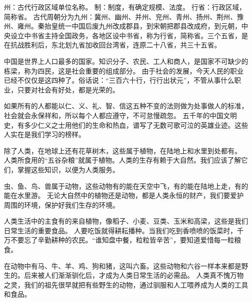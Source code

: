 \documentclass[avery5371,grid]{flashcards}
\begin{document}
{州：古代行政区域单位名称。 制：制度，有确定规模、法度。 行省：行政区域，简称省。} %
{古代周朝分为九州：冀州、幽州、并州、兖州、青州、扬州、荆州、豫州、雍州。秦抬皇统一中国后废九州改成郡县，到宋朝把郡县改成府，到元朝，中央设立中书省主持全国政务，各地区设中书省，称为行省，简称省。三个五省，是在抗战胜利后，东北划九省加收回台湾省，连原二十八省，共三十五省。} %

{中国是世界上人口最多的国家。知识分子、农民、工人和商人，是国家不可缺少的栋梁，称为四民，这是社会重要的组成部分。} %
{由于社会的发展，今天人民的职业已经不仅仅是这四种了。俗话说：“三百六十行，行行出状元”，不管从事什么职业，只要对社会有好处，都是光荣的。} %




{如果所有的人都能以仁、义、礼、智、信这五种不变的法则做为处事做人的标准，社会就会永保祥和，所以每个人都应遵守，不可怠慢疏忽。} %
{五千年的中国文明史，有多少仁义之士用他们的生命和热血，谱写了无数可歌可泣的英雄业迹。这些人实在是我们学习的榜样。} %


{除了人类，在地球上还有花草树木，这些属于植物，在陆地上和水里到处都有。} %
{人类所食用的“五谷杂粮”就属于植物。人类的生存有赖于大自然。我们应该了解它们，掌握这些知识，以便为人类服务。} %

{虫、鱼、鸟、兽属于动物，这些动物有的能在天空中飞，有的能在陆地上走，有的能在水里游。} %
{无论大自然中的植物还是动物，都是人类永恒的财产，我们要爱护周围的环境，保护好我们生存的环境。} %


{人类生活中的主食有的来自植物，像稻子、小麦、豆类、玉米和高梁，这些是我们日常生活的重要食品。} %
{人要吃饭就得耕耘播种。当我们吃到香喷喷的饭菜时，千万不要忘了辛勤耕种的农民。“谁知盘中餐，粒粒皆辛苦”，要知道爱惜每一粒粮食。} %

{在动物中有马、牛、羊、鸡、狗和猪，这叫六畜。这些动物和六谷一样本来都是野生的。后来被人们渐渐驯化后，才成为人类日常生活的必需品。} %
{人类真不愧万物之灵，我们的祖先很早就把有些野生的动物，通过驯服和人工喂养成为人类的工具和食品。} %
\end{document}

